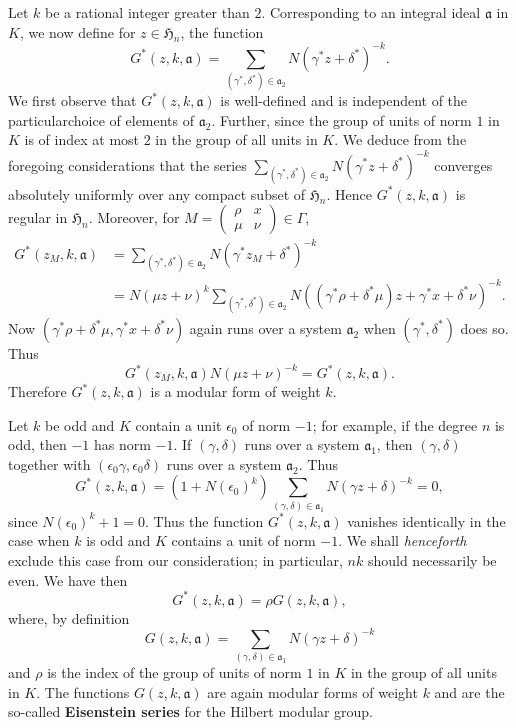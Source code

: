 Let $k$ be a rational integer greater than $2$. Corresponding to an
integral ideal $\mathfrak{a}$ in $K$, we now define for
$z\in\mathfrak{H}_{n}$, the function
$$
G^{\ast}(z,k,\mathfrak{a})=\sum_{(\gamma^{\ast},\delta^{\ast})\in\mathfrak{a}_{2}}N(\gamma^{\ast}z+\delta^{\ast})^{-k}.
$$
We first observe that $G^{\ast}(z,k,\mathfrak{a})$ is well-defined and
is independent of the particular\pageoriginale choice of elements of
$\mathfrak{a}_{2}$. Further, since the group of units of norm $1$ in
$K$ is of index at most $2$ in the group of all units in $K$. We
deduce from the foregoing considerations that the series
$\sum\limits_{(\gamma^{\ast},\delta^{\ast})\in\mathfrak{a}_{2}}N(\gamma^{\ast}z+\delta^{\ast})^{-k}$ 
converges absolutely uniformly over any compact subset of
$\mathfrak{H}_{n}$. Hence $G^{\ast}(z,k,\mathfrak{a})$ is regular in
$\mathfrak{H}_{n}$. Moreover, for $M=\left(\begin{smallmatrix} \rho &
  x\\ \mu & \nu\end{smallmatrix}\right)\in \Gamma$, 
\begin{align*}
G^{\ast}(z_{M},k,\mathfrak{a}) &=
\sum_{(\gamma^{\ast},\delta^{\ast})\in
  \mathfrak{a}_{2}}N(\gamma^{\ast}z_{M}+\delta^{\ast})^{-k}\\
&= N(\mu
z+\nu)^{k}\sum_{(\gamma^{\ast},\delta^{\ast})\in\mathfrak{a}_{2}}N((\gamma^{\ast}\rho+\delta^{\ast}\mu)z+\gamma^{\ast}x+\delta^{\ast}\nu)^{-k}.  
\end{align*}
Now
$(\gamma^{\ast}\rho+\delta^{\ast}\mu,\gamma^{\ast}x+\delta^{\ast}\nu)$
again runs over a system $\mathfrak{a}_{2}$ when
$(\gamma^{\ast},\delta^{\ast})$ does so. Thus
$$
G^{\ast}(z_{M},k,\mathfrak{a})N(\mu
z+\nu)^{-k}=G^{\ast}(z,k,\mathfrak{a}).
$$
Therefore $G^{\ast}(z,k,\mathfrak{a})$ is a modular form of weight
$k$.

Let $k$ be odd and $K$ contain a unit $\epsilon_{0}$ of norm $-1$; for
example, if the degree $n$ is odd, then $-1$ has norm $-1$. If
$(\gamma,\delta)$ runs over a system $\mathfrak{a}_{1}$, then
$(\gamma,\delta)$ together with
$(\epsilon_{0}\gamma,\epsilon_{0}\delta)$ runs over a system
$\mathfrak{a}_{2}$. Thus
$$
G^{\ast}(z,k,\mathfrak{a})=(1+N(\epsilon_{0})^{k})\sum_{(\gamma,\delta)\in\mathfrak{a}_{1}}N(\gamma
z+\delta)^{-k}=0, 
$$
since $N(\epsilon_{0})^{k}+1=0$. Thus the function
$G^{\ast}(z,k,\mathfrak{a})$ vanishes identically in the case when $k$
is odd and $K$ contains a unit of norm $-1$. We shall {\em henceforth}
exclude this case from our consideration; in particular, $nk$ should
necessarily be even. We have then
$$
G^{\ast}(z,k,\mathfrak{a})=\rho G(z,k,\mathfrak{a}),
$$
where, by definition
$$
G(z,k,\mathfrak{a})=\sum_{(\gamma,\delta)\in\mathfrak{a}_{1}}N(\gamma
z+\delta)^{-k} 
$$
and $\rho$ is the index of the group of units of norm $1$ in $K$ in
the group of all units in $K$. The functions $G(z,k,\mathfrak{a})$ are
again modular forms of weight $k$ and are the so-called {\bf
  Eisenstein series} for the Hilbert modular group.

